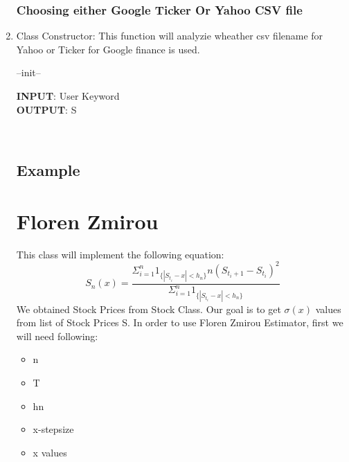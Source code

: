 \begin{enumerate}
\subsubsection{ Choosing either Google Ticker Or Yahoo CSV file}
\item  Class Constructor: This function will analyzie wheather csv filename for Yahoo or Ticker 
for Google finance is used.
\begin{algorithm}
\caption{--init--}
\bigskip
\textbf{INPUT}: User Keyword  \\
\textbf{OUTPUT}: S 
\begin{algorithmic}[1]
  \\
\end{algorithmic}
\end{algorithm}
\subsection {Example}
\newpage
\section{Floren Zmirou}
This class will implement the following equation:
\begin{equation}\label{florenZmirouEquation}
S_n(x) = \frac{\Sigma_{i=1}^{n} 1_{\{|S_{t_i}-x|<h_n\}} n (S_{t_i+1}-S_{t_i})^2}{\Sigma_{i=1}^{n} 1_{\{|S_{t_i}-x|<h_n\}}}
\end{equation}
We obtained Stock Prices from Stock Class. Our goal is to get $\sigma(x)$ values from list of Stock Prices S.
In order to use Floren Zmirou Estimator, first we will need following:\\
\begin{itemize}
  \item n
  \item T
  \item hn
  \item x-step\-size
  \item x values
\end{itemize}

\end{enumerate}
